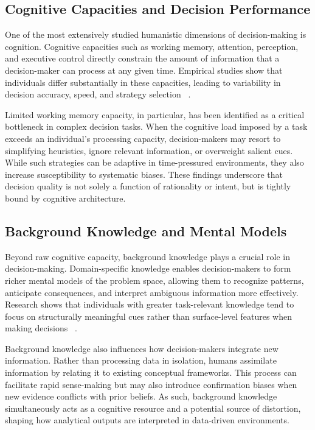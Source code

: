 \documentclass{sfuthesis}
\begin{document}
\subsection{Cognitive Capacities and Decision Performance}
One of the most extensively studied humanistic dimensions of decision-making is cognition. Cognitive capacities such as working memory, attention, perception, and executive control directly constrain the amount of information that a decision-maker can process at any given time. Empirical studies show that individuals differ substantially in these capacities, leading to variability in decision accuracy, speed, and strategy selection ~\cite{tenenbaum_relationship_1993}.\par
Limited working memory capacity, in particular, has been identified as a critical bottleneck in complex decision tasks. When the cognitive load imposed by a task exceeds an individual’s processing capacity, decision-makers may resort to simplifying heuristics, ignore relevant information, or overweight salient cues. While such strategies can be adaptive in time-pressured environments, they also increase susceptibility to systematic biases. These findings underscore that decision quality is not solely a function of rationality or intent, but is tightly bound by cognitive architecture.
\subsection{Background Knowledge and Mental Models}
Beyond raw cognitive capacity, background knowledge plays a crucial role in decision-making. Domain-specific knowledge enables decision-makers to form richer mental models of the problem space, allowing them to recognize patterns, anticipate consequences, and interpret ambiguous information more effectively. Research shows that individuals with greater task-relevant knowledge tend to focus on structurally meaningful cues rather than surface-level features when making decisions ~\cite{eberhard_effects_2023}.\par
Background knowledge also influences how decision-makers integrate new information. Rather than processing data in isolation, humans assimilate information by relating it to existing conceptual frameworks. This process can facilitate rapid sense-making but may also introduce confirmation biases when new evidence conflicts with prior beliefs. As such, background knowledge simultaneously acts as a cognitive resource and a potential source of distortion, shaping how analytical outputs are interpreted in data-driven environments.
\end{document}
